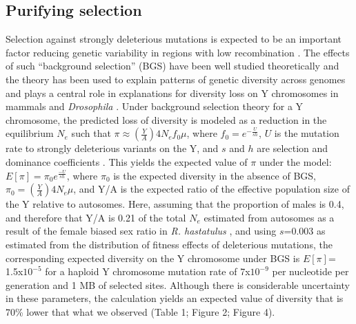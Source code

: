\documentclass[9pt,twocolumn,twoside,lineno]{gsajnl}
\begin{document}
\subsection*{Purifying selection}
Selection against strongly deleterious mutations is expected to be an important factor reducing genetic variability in regions with low recombination \citep{charlesworth1993effect, charlesworth1996background}. The effects of such “background selection” (BGS) have been well studied theoretically \citep{charlesworth1997effects, nordborg1996effect, kim2000joint} and the theory has been used to explain patterns of genetic diversity across genomes \citep{comeron2014background} and plays a central role in explanations for diversity loss on Y chromosomes in mammals \citep{Wilsonsayres2014} and \textit{Drosophila} \citep{mcallister1999, charlesworth1996CB}. Under background selection theory for a Y chromosome, the predicted loss of diversity is modeled as a reduction in the equilibrium $N_{e}$ such that $\pi \approx (\frac{Y}{A})4N_{e}f_{0}\mu$, where $f_{0}=e^{-\frac{U}{sh}}$, $U$ is the mutation rate to strongly deleterious variants on the Y, and $s$ and $h$ are selection and dominance coefficients \citep{hudson1995deleterious}. This yields the expected value of $\pi$ under the model: $E[\pi]=\pi_{0}e^{\frac{-U}{sh}}$, where $\pi_{0}$ is the expected diversity in the absence of BGS, $\pi_{0}=(\frac{Y}{A})4N_{e}\mu$, and Y/A is the expected ratio of the effective population size of the Y relative to autosomes. Here, assuming that the proportion of males is 0.4, and therefore that Y/A is 0.21 of the total $N_{e}$ estimated from autosomes as a result of the female biased sex ratio in \textit{R. hastatulus} \citep{pickup2013influence}, and using $s$=0.003 as estimated from the distribution of fitness effects of deleterious mutations, the corresponding expected diversity on the Y chromosome under BGS is $E[\pi]$= 1.5x$10^{-5}$ for a haploid Y chromosome mutation rate of 7x$10^{-9}$ per nucleotide per generation and 1 MB of selected sites. Although there is considerable uncertainty in these parameters, the calculation yields an expected value of diversity that is 70\% lower that what we observed (Table 1; Figure 2; Figure 4).
\end{document}
